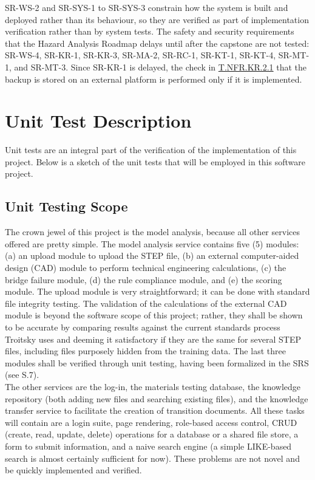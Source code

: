 \documentclass[12pt, titlepage]{article}
\newcommand{\testref}[1]{\hyperlink{test:#1}{#1}}
\begin{document}
SR-WS-2 and SR-SYS-1 to SR-SYS-3 constrain how the system is built and deployed
rather than its behaviour, so they are verified as part of implementation
verification rather than by system tests. The safety and security requirements
that the Hazard Analysis Roadmap delays until after the capstone are not tested:
SR-WS-4, SR-KR-1, SR-KR-3, SR-MA-2, SR-RC-1, SR-KT-1, SR-KT-4, SR-MT-1, and
SR-MT-3. Since SR-KR-1 is delayed, the check in \testref{T.NFR.KR.2.1} that the
backup is stored on an external platform is performed only if it is
implemented.

\section{Unit Test Description}



Unit tests are an integral part of the verification of the implementation of this project.
Below is a sketch of the unit tests that will be employed in this software project. 


\subsection{Unit Testing Scope}

  The crown jewel of this project is the model analysis, because all other services offered are pretty simple.
  The model analysis service contains five (5) modules: (a) an upload module to upload the STEP file,
  (b) an external computer-aided design (CAD) module to perform technical engineering calculations, (c) the bridge failure
  module, (d) the rule compliance module, and (e) the scoring module. The upload module is very straightforward; it can be done with standard file integrity testing. The validation of the calculations of the external CAD module is beyond the software
  scope of this project; rather, they shall be shown to be accurate by comparing results against the current standards
  process Troitsky uses and deeming it satisfactory if they are the same for several STEP files, including
  files purposely hidden from the training data. The last three modules shall be verified through unit testing, having
  been formalized in the SRS (see S.7). \\

  The other services are the log-in, the materials testing database, the knowledge repository
  (both adding new files and searching existing files),
  and the knowledge transfer service to facilitate the creation of transition documents. All these tasks will
  contain are a login suite, page rendering, role-based access control, CRUD (create, read, update, delete) operations for
   a database or a shared file store, 
  a form to submit information, and a naive search engine (a simple LIKE-based search is almost certainly sufficient for now). 
  These problems are not novel and be quickly implemented and verified. \\
  
\end{document}

